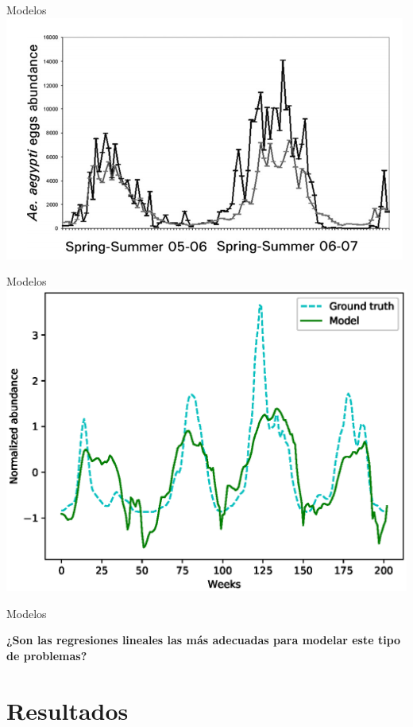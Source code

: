 \documentclass[10pt]{beamer}
\begin{document}
\begin{frame}{Modelos}
  \includegraphics[width=\textwidth]{lineal3.png}
\end{frame}

\begin{frame}{Modelos}
  \includegraphics[width=\textwidth]{linear.eps}
\end{frame}



\begin{frame}{Modelos}
  \begin{center}
    \textbf{¿Son las regresiones lineales las más adecuadas para modelar este
      tipo de problemas?}
  \end{center}
\end{frame}

\section{Resultados}
\end{document}
